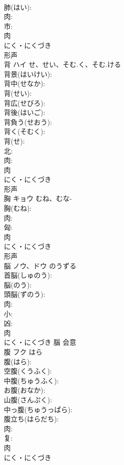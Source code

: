 \documentclass[8pt]{extreport}
\begin{document}
\begin{CJK}{UTF8}{min}
\\	肺(はい): 
\\	肉: 
\\	市: 
\\	肉	
\\	にく・にくづき	
\\	形声 
\\	背	ハイ	せ、せい、そむ.く、そむ.ける		
\\	背景(はいけい): 
\\	背中(せなか): 
\\	背(せい): 
\\	背広(せびろ): 
\\	背後(はいご): 
\\	背負う(せおう): 
\\	背く(そむく): 
\\	背(せ): 
\\	北: 
\\	肉: 
\\	肉	
\\	にく・にくづき	
\\	形声 
\\	胸	キョウ	むね、むな-		
\\	胸(むね): 
\\	肉: 
\\	匈: 
\\	肉	
\\	にく・にくづき	
\\	形声 
\\	脳	ノウ、ドウ	のうずる		
\\	首脳(しゅのう): 
\\	脳(のう): 
\\	頭脳(ずのう): 
\\	肉: 
\\	小: 
\\	凶: 
\\	肉	
\\	にく・にくづき	腦	会意 
\\	腹	フク	はら		
\\	腹(はら): 
\\	空腹(くうふく): 
\\	中腹(ちゅうふく): 
\\	お腹(おなか): 
\\	山腹(さんぷく): 
\\	中っ腹(ちゅうっぱら): 
\\	腹立ち(はらだち): 
\\	肉: 
\\	复: 
\\	肉	
\\	にく・にくづき	

\end{CJK}
\end{document}

